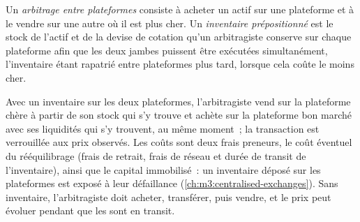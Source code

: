 \begin{omfigure}
\centering
{}

\label{fig:m3:spot-markets:triangle}
\end{omfigure}

\begin{definition}\label{def:m3:spot-markets:cross}
Un \emph{arbitrage entre plateformes} consiste à acheter un actif sur une plateforme et à le vendre sur une autre
où il est plus cher. Un \emph{inventaire prépositionné} est le stock de
l'actif et de la devise de cotation qu'un arbitragiste conserve sur chaque plateforme afin que les deux jambes puissent être exécutées
simultanément, l'inventaire étant rapatrié entre plateformes plus tard, lorsque cela coûte le moins cher.
\end{definition}

Avec un inventaire sur les deux plateformes, l'arbitragiste vend sur la plateforme chère à partir de son stock qui s'y trouve et achète
sur la plateforme bon marché avec ses liquidités qui s'y trouvent, au même moment~; la transaction est verrouillée aux prix observés. Les coûts
sont deux frais preneurs, le coût éventuel du rééquilibrage (frais de retrait, frais de réseau et durée de transit de l'inventaire),
ainsi que le capital immobilisé~: un inventaire déposé sur les plateformes est exposé à leur défaillance
(\cref{ch:m3:centralised-exchanges}). Sans inventaire, l'arbitragiste doit acheter, transférer, puis
vendre, et le prix peut évoluer pendant que les  sont en transit.

